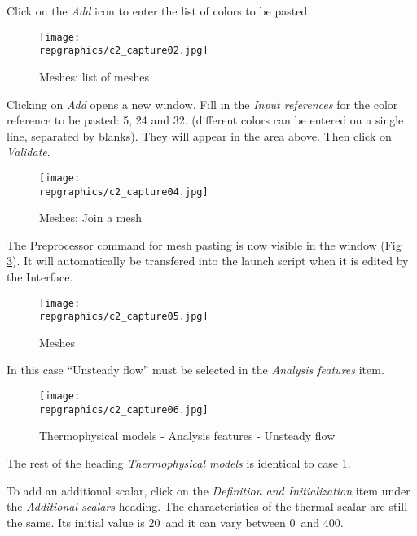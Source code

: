 Click on the {\itshape Add} icon to enter the list of colors to be pasted.

\begin{figure}[h!]
\begin{center}
\texttt{[image: \\repgraphics/c2\_capture02.jpg]} 
\caption{Meshes: list of meshes}
\label{fig2_e2}
\end{center}
\end{figure}


\newpage
Clicking on {\itshape Add} opens a new window. Fill in the
{\itshape Input references} for the color reference to be pasted: 5, 24 and 32.
(different colors can be entered on a single line, separated by blanks). They
will appear in the area above. Then click on {\itshape Validate}. 


\begin{figure}[h!]
\begin{center}
\texttt{[image: \\repgraphics/c2\_capture04.jpg]} 
\caption{Meshes: Join a mesh}
\label{fig4_e2}
\end{center}
\end{figure}


\newpage
The Preprocessor command for mesh pasting is now visible in the window (Fig
\ref{fig5_e2}). It will automatically be transfered into the launch script when
it is edited by the Interface.

\begin{figure}[h!]
\begin{center}
\texttt{[image: \\repgraphics/c2\_capture05.jpg]} 
\caption{Meshes}
\label{fig5_e2}
\end{center}
\end{figure}


\newpage
In this case ``Unsteady flow'' must be selected in the
{\itshape Analysis features} item. 

\begin{figure}[h!]
\begin{center}
\texttt{[image: \\repgraphics/c2\_capture06.jpg]} 
\caption{Thermophysical models - Analysis features - Unsteady flow}
\label{fig6_e2}
\end{center}
\end{figure}

The rest of the heading {\itshape Thermophysical models} is identical to case
1.


\newpage
To add an additional scalar, click on the
{\itshape Definition and Initialization} item under the
{\itshape Additional scalars} heading.
The characteristics of the thermal scalar are still the
same. Its initial value is 20\degresC\ and it can vary between
0\degresC\ and 400\degresC. 

